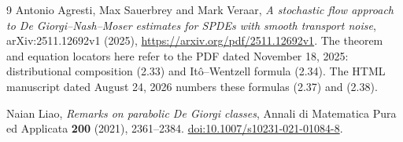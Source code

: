 \documentclass[11pt]{article}
\begin{document}
\begin{thebibliography}{9}
Antonio Agresti, Max Sauerbrey and Mark Veraar,
\emph{A stochastic flow approach to De Giorgi--Nash--Moser estimates for
SPDEs with smooth transport noise}, arXiv:2511.12692v1 (2025),
\url{https://arxiv.org/pdf/2511.12692v1}.
The theorem and equation locators here refer to the PDF dated November 18,
2025: distributional composition (2.33) and It\^o--Wentzell formula (2.34).
The HTML manuscript dated August 24, 2026 numbers these formulas
(2.37) and (2.38).

Naian Liao, \emph{Remarks on parabolic De Giorgi classes},
Annali di Matematica Pura ed Applicata \textbf{200} (2021), 2361--2384.
\href{https://doi.org/10.1007/s10231-021-01084-8}{doi:10.1007/s10231-021-01084-8}.
\end{thebibliography}
\end{document}

